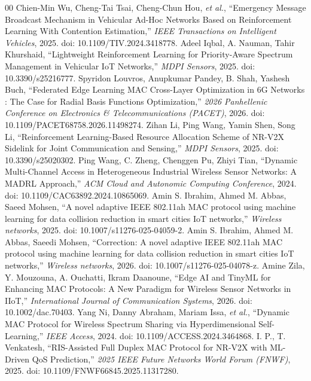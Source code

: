 \documentclass[journal]{IEEEtran}
\begin{document}
\begin{thebibliography}{00}
 Chien-Min Wu, Cheng-Tai Tsai, Cheng-Chun Hou, \emph{et al.}, ``Emergency Message Broadcast Mechanism in Vehicular Ad-Hoc Networks Based on Reinforcement Learning With Contention Estimation,'' \emph{IEEE Transactions on Intelligent Vehicles}, 2025. doi: 10.1109/TIV.2024.3418778.
 Adeel Iqbal, A. Nauman, Tahir Khurshaid, ``Lightweight Reinforcement Learning for Priority-Aware Spectrum Management in Vehicular IoT Networks,'' \emph{MDPI Sensors}, 2025. doi: 10.3390/s25216777.
 Spyridon Louvros, Anupkumar Pandey, B. Shah, Yashesh Buch, ``Federated Edge Learning MAC Cross-Layer Optimization in 6G Networks : The Case for Radial Basis Functions Optimization,'' \emph{2026 Panhellenic Conference on Electronics & Telecommunications (PACET)}, 2026. doi: 10.1109/PACET68758.2026.11498274.
 Zihan Li, Ping Wang, Yamin Shen, Song Li, ``Reinforcement Learning-Based Resource Allocation Scheme of NR-V2X Sidelink for Joint Communication and Sensing,'' \emph{MDPI Sensors}, 2025. doi: 10.3390/s25020302.
 Ping Wang, C. Zheng, Chenggen Pu, Zhiyi Tian, ``Dynamic Multi-Channel Access in Heterogeneous Industrial Wireless Sensor Networks: A MADRL Approach,'' \emph{ACM Cloud and Autonomic Computing Conference}, 2024. doi: 10.1109/CAC63892.2024.10865069.
 Amin S. Ibrahim, Ahmed M. Abbas, Saeed Mohsen, ``A novel adaptive IEEE 802.11ah MAC protocol using machine learning for data collision reduction in smart cities IoT networks,'' \emph{Wireless networks}, 2025. doi: 10.1007/s11276-025-04059-2.
 Amin S. Ibrahim, Ahmed M. Abbas, Saeedi Mohsen, ``Correction: A novel adaptive IEEE 802.11ah MAC protocol using machine learning for data collision reduction in smart cities IoT networks,'' \emph{Wireless networks}, 2026. doi: 10.1007/s11276-025-04078-z.
 Amine Zila, Y. Mouzouna, A. Ouchatti, Ikram Daanoune, ``Edge AI and TinyML for Enhancing MAC Protocols: A New Paradigm for Wireless Sensor Networks in IIoT,'' \emph{International Journal of Communication Systems}, 2026. doi: 10.1002/dac.70403.
 Yang Ni, Danny Abraham, Mariam Issa, \emph{et al.}, ``Dynamic MAC Protocol for Wireless Spectrum Sharing via Hyperdimensional Self-Learning,'' \emph{IEEE Access}, 2024. doi: 10.1109/ACCESS.2024.3464868.
 I. P., T. Venkatesh, ``RIS-Assisted Full Duplex MAC Protocol for NR-V2X with ML-Driven QoS Prediction,'' \emph{2025 IEEE Future Networks World Forum (FNWF)}, 2025. doi: 10.1109/FNWF66845.2025.11317280.


\end{thebibliography}
\end{document}
